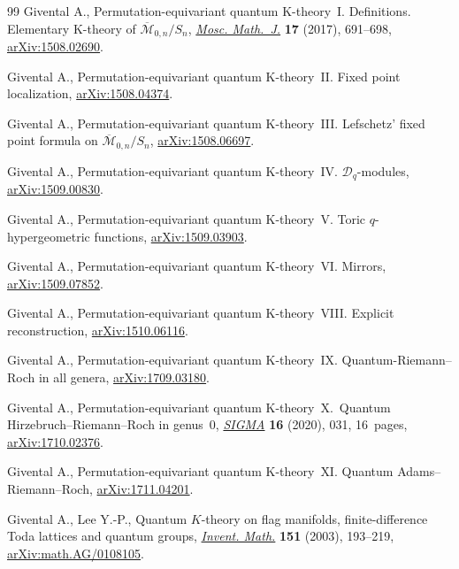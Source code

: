 \begin{thebibliography}{99}
Givental A., Permutation-equivariant quantum {K}-theory~{I}. {D}efinitions.
 {E}lementary {K}-theory of {$\overline{\mathcal M}_{0,n}/S_n$}, \href{https://doi.org/10.17323/1609-4514-2016-16-4-691-698}{\textit{Mosc.
 Math.~J.}} \textbf{17} (2017), 691--698, \href{https://arxiv.org/abs/1508.02690}{arXiv:1508.02690}.

Givental A., Permutation-equivariant quantum {K}-theory~{II}. Fixed point
 localization, \href{https://arxiv.org/abs/1508.04374}{arXiv:1508.04374}.

Givental A., Permutation-equivariant quantum {K}-theory~{III}. {L}efschetz'
 fixed point formula on {${\overline{\mathcal M}}_{0,n}/S_n$},
 \href{https://arxiv.org/abs/1508.06697}{arXiv:1508.06697}.

Givental A., Permutation-equivariant quantum {K}-theory~{IV}. {${\mathcal
 D}_q$}-modules, \href{https://arxiv.org/abs/1509.00830}{arXiv:1509.00830}.

Givental A., Permutation-equivariant quantum {K}-theory~{V}. {T}oric
 {$q$}-hypergeometric functions, \href{https://arxiv.org/abs/1509.03903}{arXiv:1509.03903}.

Givental A., Permutation-equivariant quantum {K}-theory~{VI}. {M}irrors,
 \href{https://arxiv.org/abs/1509.07852}{arXiv:1509.07852}.

Givental A., Permutation-equivariant quantum {K}-theory~{VIII}. {E}xplicit
 reconstruction, \href{https://arxiv.org/abs/1510.06116}{arXiv:1510.06116}.

Givental A., Permutation-equivariant quantum {K}-theory~{IX}.
 {Q}uantum-{R}iemann--{R}och in all genera, \href{https://arxiv.org/abs/1709.03180}{arXiv:1709.03180}.

Givental A., Permutation-equivariant quantum {K}-theory~{X}.~{Q}uantum
 {H}irzebruch--{R}iemann--{R}och in genus~0, \href{https://doi.org/10.3842/SIGMA.2020.031}{\textit{SIGMA}} \textbf{16}
 (2020), 031, 16~pages, \href{https://arxiv.org/abs/1710.02376}{arXiv:1710.02376}.

Givental A., Permutation-equivariant quantum {K}-theory~{XI}. Quantum
 {A}dams--{R}iemann--{R}och, \href{https://arxiv.org/abs/1711.04201}{arXiv:1711.04201}.


Givental A., Lee Y.-P., Quantum {$K$}-theory on flag manifolds,
 finite-difference {T}oda lattices and quantum groups, \href{https://doi.org/10.1007/s00222-002-0250-y}{\textit{Invent. Math.}}
 \textbf{151} (2003), 193--219, \href{https://arxiv.org/abs/math.AG/0108105}{arXiv:math.AG/0108105}.


\end{thebibliography}
